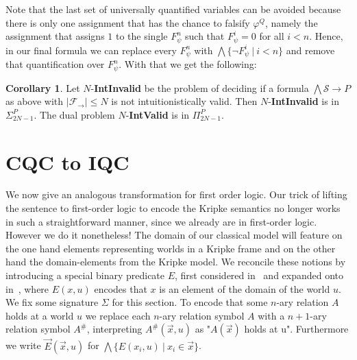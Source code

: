 \documentclass[a4paper,11pt]{report}
\theoremstyle{definition}
\theoremstyle{definition}
\newtheorem{corollary}[theorem]{Corollary}
\theoremstyle{definition}
\theoremstyle{definition}
\theoremstyle{definition}
\theoremstyle{definition}
\theoremstyle{definition}
\begin{document}
	Note that the last set of universally quantified variables can be avoided because there is only one assignment that has the chance to falsify $\varphi^Q$, namely the assignment that assigns $1$ to the single $F_\psi^n$ such that $F_\psi^i = 0$ for all $i < n$. Hence, in our final formula we can replace every $F_\psi^n$ with $\bigwedge\{\neg F_\psi^i\:|\:i < n\}$ and remove that quantification over $F_\psi^n$. With that we get the following:
	
	\begin{corollary}
		Let $N$-\textbf{IntInvalid} be the problem of deciding if a formula $\bigwedge \mathcal S\to P$ as above with $|\mathcal F_\to|\leq N$ is not intuitionistically valid. Then $N$-\textbf{IntInvalid} is in $\Sigma_{2N-1}^P$. The dual problem $N$-\textbf{IntValid} is in $\Pi_{2N-1}^P$.
	\end{corollary}
	
	\section{CQC to IQC}\label{section:CQCIQC}
	
	We now give an analogous transformation for first order logic. Our trick of lifting the sentence to first-order logic to encode the Kripke semantics no longer works in such a straightforward manner, since we already are in first-order logic. However we do it nonetheless! The domain of our classical model will feature on the one hand elements representing worlds in a Kripke frame and on the other hand the domain-elements from the Kripke model. We reconcile these notions by introducing a special binary predicate $E$, first considered in~\cite{baaz2006skolemization} and expanded onto in~\cite{iemhoff2010eskolemization}, where $E(x, u)$ encodes that $x$ is an element of the domain of the world $u$. We fix some signature $\Sigma$ for this section. To encode that some $n$-ary relation $A$ holds at a world $u$ we replace each $n$-ary relation symbol $A$ with a $n+1$-ary relation symbol $A^\#$, interpreting $A^\#(\vec x, u)$ as "$A(\vec x)$ holds at u". Furthermore we write $\vec E(\vec x, u)$ for $\bigwedge\{E(x_i, u)\:|\:x_i\in \vec x\}$.
	
\end{document}
